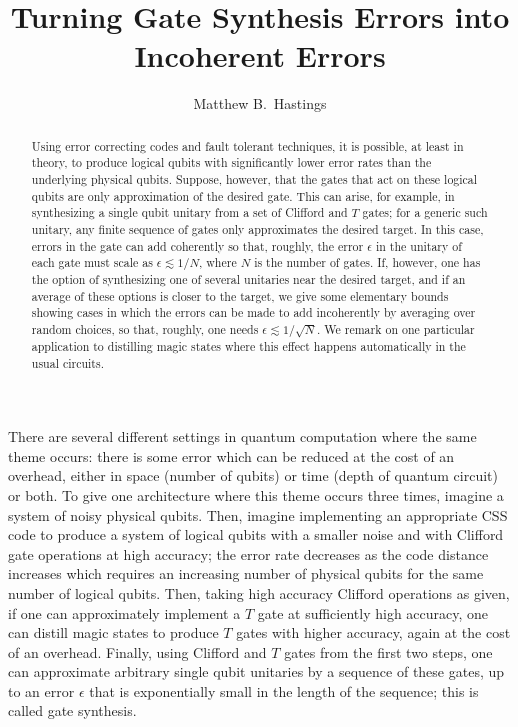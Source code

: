 \documentclass[aps,prl,amsmath,amssymb,amsfonts,superscriptaddress,floatfix]{revtex4}
\begin{document}
\title{Turning Gate Synthesis Errors into Incoherent Errors}

\author{Matthew B.~Hastings}



\begin{abstract}
Using error correcting codes and fault tolerant techniques, it is possible, at least in theory, to produce logical qubits
with significantly lower error rates than the underlying physical qubits.  Suppose, however, that the gates that act on these logical qubits are only approximation of the desired gate.  This can arise, for example, in synthesizing a single qubit unitary from a set of Clifford and $T$ gates; for a generic such unitary, any finite sequence of gates only approximates the desired target.
In this case, errors in the gate can add coherently
so that, roughly, the error $\epsilon$ in the unitary of each gate must scale as $\epsilon \lesssim 1/N$, where $N$
is the number of gates.  If, however, one has the option of synthesizing one of several unitaries near the desired
target, and if an average of these options is closer to the target, we give some elementary bounds showing cases
in which the errors can be made to add incoherently by averaging over
random choices, so that, roughly, one needs $\epsilon \lesssim 1/\sqrt{N}$.
We remark on one particular application to distilling magic states where this effect happens automatically in the usual circuits.
\end{abstract}
\maketitle

There are several different settings in quantum computation where the same theme occurs: there is some error which can be reduced at the cost of an overhead, either in space (number of qubits) or time (depth of quantum circuit) or both\cite{th1,th2,th3,th4}.
To give one architecture where this theme occurs three times, imagine a system of noisy physical qubits.  Then,
imagine implementing an appropriate CSS code to produce a system of logical qubits with a smaller noise and with Clifford gate operations at high accuracy; the error rate decreases as the code distance increases which requires an increasing number of physical qubits for the same number of logical qubits.  Then, taking high accuracy Clifford operations as given, if one can approximately implement a $T$ gate at sufficiently high accuracy, one can distill magic states to produce $T$ gates with higher accuracy, again at the cost of an overhead\cite{bk,mk,mk2}.  Finally, using Clifford and $T$ gates from the first two steps, one can approximate arbitrary single qubit unitaries by a sequence of these gates, up to an error $\epsilon$ that is exponentially small in the length of the sequence; this is called gate synthesis\cite{sk,synth}.
\end{document}
